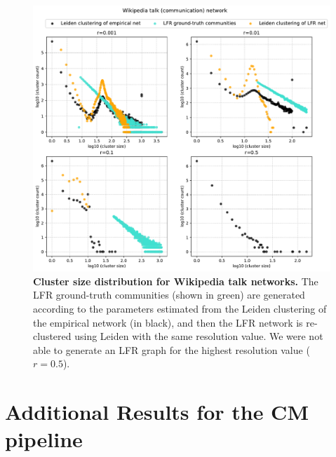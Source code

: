 \documentclass[a4paper]{article}   	%
\begin{document}
\begin{figure}[H]
\centering
\includegraphics[width=0.85\linewidth]{figs/wiki_talk_cm_size.pdf}
\caption[Cluster size distribution for Wikipedia talk networks.]{\textbf{Cluster size distribution for Wikipedia talk networks.} The LFR ground-truth communities (shown in green) are generated according to the parameters estimated from the Leiden clustering of the empirical network (in black), and then the LFR network is re-clustered using Leiden with the same resolution value. We were not able to generate an LFR graph for the highest resolution value ($r = 0.5$).}
\label{fig:wiki_talk_cm_size}
\end{figure}

\clearpage

\section{Additional Results for the CM pipeline}
\end{document}
